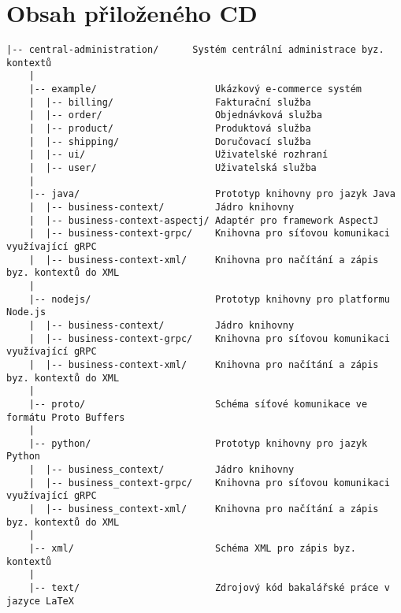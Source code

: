 
\chapter{Obsah přiloženého CD}

\begin{Verbatim}[fontsize=\footnotesize]
    |-- central-administration/      Systém centrální administrace byz. kontextů
    |
    |-- example/                     Ukázkový e-commerce systém
    |  |-- billing/                  Fakturační služba
    |  |-- order/                    Objednávková služba
    |  |-- product/                  Produktová služba
    |  |-- shipping/                 Doručovací služba
    |  |-- ui/                       Uživatelské rozhraní
    |  |-- user/                     Uživatelská služba
    |
    |-- java/                        Prototyp knihovny pro jazyk Java
    |  |-- business-context/         Jádro knihovny
    |  |-- business-context-aspectj/ Adaptér pro framework AspectJ
    |  |-- business-context-grpc/    Knihovna pro síťovou komunikaci využívající gRPC
    |  |-- business-context-xml/     Knihovna pro načítání a zápis byz. kontextů do XML
    |
    |-- nodejs/                      Prototyp knihovny pro platformu Node.js
    |  |-- business-context/         Jádro knihovny
    |  |-- business-context-grpc/    Knihovna pro síťovou komunikaci využívající gRPC
    |  |-- business-context-xml/     Knihovna pro načítání a zápis byz. kontextů do XML
    |
    |-- proto/                       Schéma síťové komunikace ve formátu Proto Buffers
    |
    |-- python/                      Prototyp knihovny pro jazyk Python
    |  |-- business_context/         Jádro knihovny
    |  |-- business_context-grpc/    Knihovna pro síťovou komunikaci využívající gRPC
    |  |-- business_context-xml/     Knihovna pro načítání a zápis byz. kontextů do XML
    |
    |-- xml/                         Schéma XML pro zápis byz. kontextů
    |
    |-- text/                        Zdrojový kód bakalářské práce v jazyce LaTeX
\end{Verbatim}
